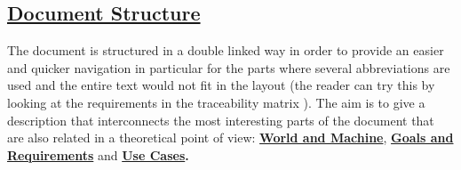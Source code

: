 \subsection[Document Structure]{\hyperlink{toc}{Document Structure}}
	The document is structured in a double linked way in order to provide an easier and quicker navigation in particular for the parts where several abbreviations are used and the entire text would not fit in the layout (the reader can try this by looking at the requirements in the traceability matrix ). The aim is to give a description that interconnects the most interesting parts of the document that are also related in a theoretical point of view: \textbf{\hyperref[sec:worldMachine]{World and Machine}},
	\textbf{\hyperref[sec:goalSatisfaction]{Goals and Requirements}}  and \textbf{\hyperref[sec:useCases]{Use Cases}.}\\
	
